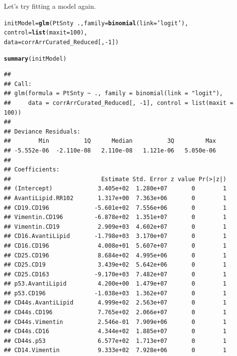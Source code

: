 \documentclass[a4paper]{article}\usepackage[]{graphicx}\usepackage[]{color}
\makeatletter
\newcommand{\hlnum}[1]{\textcolor[rgb]{0.686,0.059,0.569}{#1}}%
\newcommand{\hlstr}[1]{\textcolor[rgb]{0.192,0.494,0.8}{#1}}%
\newcommand{\hlopt}[1]{\textcolor[rgb]{0,0,0}{#1}}%
\newcommand{\hlstd}[1]{\textcolor[rgb]{0.345,0.345,0.345}{#1}}%
\newcommand{\hlkwb}[1]{\textcolor[rgb]{0.69,0.353,0.396}{#1}}%
\newcommand{\hlkwc}[1]{\textcolor[rgb]{0.333,0.667,0.333}{#1}}%
\newcommand{\hlkwd}[1]{\textcolor[rgb]{0.737,0.353,0.396}{\textbf{#1}}}%
\newenvironment{kframe}{%
 \def\at@end@of@kframe{}%
 \ifinner\ifhmode%
  \def\at@end@of@kframe{\end{minipage}}%
  \begin{minipage}{\columnwidth}%
 \fi\fi%
 \def\FrameCommand##1{\hskip\@totalleftmargin \hskip-\fboxsep
 \colorbox{shadecolor}{##1}\hskip-\fboxsep
     \hskip-\linewidth \hskip-\@totalleftmargin \hskip\columnwidth}%
 \MakeFramed {\advance\hsize-\width
   \@totalleftmargin\z@ \linewidth\hsize
   \@setminipage}}%
 {\par\unskip\endMakeFramed%
 \at@end@of@kframe}
\newenvironment{knitrout}{}{} %
\makeatother
\begin{document}
Let's try fitting a model again.
\begin{knitrout}
\color{fgcolor}\begin{kframe}
\begin{alltt}
\hlstd{initModel} \hlkwb{=} \hlkwd{glm}\hlstd{(PtSnty} \hlopt{~}\hlstd{.,}\hlkwc{family}\hlstd{=}\hlkwd{binomial}\hlstd{(}\hlkwc{link}\hlstd{=}\hlstr{'logit'}\hlstd{),}
                \hlkwc{control} \hlstd{=} \hlkwd{list}\hlstd{(}\hlkwc{maxit} \hlstd{=} \hlnum{100}\hlstd{),}
                \hlkwc{data}\hlstd{=corrArrCurated_Reduced[,}\hlopt{-}\hlnum{1}\hlstd{])}
\end{alltt}


{\ttfamily\noindent\color{warningcolor}{\#\# Warning: glm.fit: fitted probabilities numerically 0 or 1 occurred}}\begin{alltt}
\hlkwd{summary}\hlstd{(initModel)}
\end{alltt}
\begin{verbatim}
## 
## Call:
## glm(formula = PtSnty ~ ., family = binomial(link = "logit"), 
##     data = corrArrCurated_Reduced[, -1], control = list(maxit = 100))
## 
## Deviance Residuals: 
##        Min          1Q      Median          3Q         Max  
## -5.552e-06  -2.110e-08   2.110e-08   1.121e-06   5.050e-06  
## 
## Coefficients:
##                          Estimate Std. Error z value Pr(>|z|)
## (Intercept)             3.405e+02  1.280e+07       0        1
## AvantiLipid.RR102       1.317e+00  7.363e+06       0        1
## CD19.CD196             -5.601e+02  7.556e+06       0        1
## Vimentin.CD196         -6.878e+02  1.351e+07       0        1
## Vimentin.CD19           2.909e+03  4.602e+07       0        1
## CD16.AvantiLipid       -1.798e+03  3.170e+07       0        1
## CD16.CD196              4.008e+01  5.607e+07       0        1
## CD25.CD196              8.684e+02  4.995e+06       0        1
## CD25.CD19               3.439e+02  5.642e+06       0        1
## CD25.CD163             -9.170e+03  7.482e+07       0        1
## p53.AvantiLipid         4.200e+00  1.479e+07       0        1
## p53.CD196              -1.038e+03  1.362e+07       0        1
## CD44s.AvantiLipid       4.999e+02  2.563e+07       0        1
## CD44s.CD196             7.765e+02  2.066e+07       0        1
## CD44s.Vimentin          2.546e-01  7.909e+06       0        1
## CD44s.CD16              4.344e+02  1.885e+07       0        1
## CD44s.p53               6.577e+02  1.713e+07       0        1
## CD14.Vimentin           9.333e+02  7.928e+06       0        1

\end{verbatim}
\end{kframe}
\end{knitrout}
\end{document}
